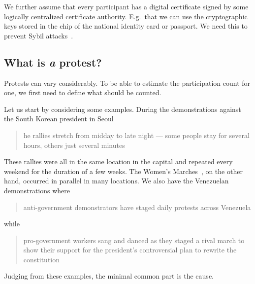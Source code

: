 We further assume that every participant has a digital certificate signed by 
some logically centralized certificate authority.
E.g.\ that we can use the cryptographic keys stored in the chip of the national 
identity card or passport.
We need this to prevent Sybil attacks~\cite{SybilAttack}.

\subsection{What is \protect\emph{a} protest?}%
\label{WhatIsAProtest}

Protests can vary considerably.
To be able to estimate the participation count for one, we first need to define
what should be counted.

Let us start by considering some examples.
During the demonstrations against the South Korean president in Seoul
\blockcquote{2016DemonstrationsInSeoul}{%
  he rallies stretch from midday to late night --- some 
  people stay for several hours, others just several minutes%
}.
These rallies were all in the same location in the capital and repeated every 
weekend for the duration of a few weeks.
The Women's Marches~\cite{2017WomensMarchesInUS}, on the other hand, occurred 
in parallel in many locations.
We also have the Venezuelan demonstrations where
\blockcquote{2017VenezuelaProtestFrequency}{%
  anti-government demonstrators have staged daily protests across Venezuela%
} while
\blockcquote{AlJazeeraOnVenezuela2017}{%
  pro-government workers sang and danced as they staged a rival march to show 
  their support for the president's controversial plan to rewrite the 
  constitution%
}.
Judging from these examples, the minimal common part is the cause.


